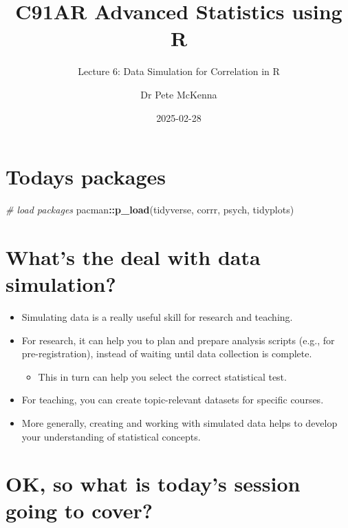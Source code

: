\documentclass[
]{article}
\title{C91AR \textbar{} Advanced Statistics using R}
\subtitle{Lecture 6: Data Simulation for Correlation in R}
\author{Dr Pete McKenna}
\date{2025-02-28}
\newenvironment{Shaded}{\begin{snugshade}}{\end{snugshade}}
\newcommand{\CommentTok}[1]{\textcolor[rgb]{0.56,0.35,0.01}{\textit{#1}}}
\newcommand{\FunctionTok}[1]{\textcolor[rgb]{0.13,0.29,0.53}{\textbf{#1}}}
\newcommand{\NormalTok}[1]{#1}
\newcommand{\SpecialCharTok}[1]{\textcolor[rgb]{0.81,0.36,0.00}{\textbf{#1}}}
\providecommand{\tightlist}{%
  \setlength{\itemsep}{0pt}\setlength{\parskip}{0pt}}
\begin{document}
\maketitle

{
\setcounter{tocdepth}{2}
\tableofcontents
}
\hypertarget{todays-packages}{%
\section{Todays packages}\label{todays-packages}}

\begin{Shaded}
\begin{Highlighting}[]
\CommentTok{\# load packages}
\NormalTok{pacman}\SpecialCharTok{::}\FunctionTok{p\_load}\NormalTok{(tidyverse,}
\NormalTok{               corrr,}
\NormalTok{               psych,}
\NormalTok{               tidyplots)}
\end{Highlighting}
\end{Shaded}

\hypertarget{whats-the-deal-with-data-simulation}{%
\section{What's the deal with data
simulation?}\label{whats-the-deal-with-data-simulation}}

\begin{itemize}
\tightlist
\item
  Simulating data is a really useful skill for research and teaching.
\item
  For research, it can help you to plan and prepare analysis scripts
  (e.g., for pre-registration), instead of waiting until data collection
  is complete.

  \begin{itemize}
  \tightlist
  \item
    This in turn can help you select the correct statistical test.
  \end{itemize}
\item
  For teaching, you can create topic-relevant datasets for specific
  courses.
\item
  More generally, creating and working with simulated data helps to
  develop your understanding of statistical concepts.
\end{itemize}

\hypertarget{ok-so-what-is-todays-session-going-to-cover}{%
\section{OK, so what is today's session going to
cover?}\label{ok-so-what-is-todays-session-going-to-cover}}
\end{document}
